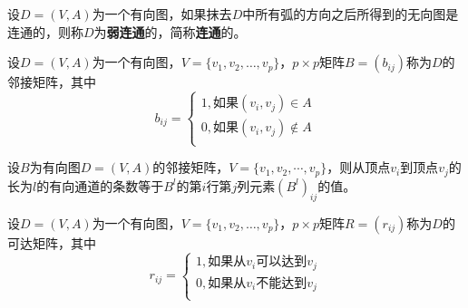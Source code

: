    \begin{Def}
   设$D=(V,A)$为一个有向图，如果抹去$D$中所有弧的方向之后所得到的无向图是连通的，则称$D$为{\bfseries 弱连通}的，简称{\bfseries 连通}的。 
  \end{Def}
  \centering

 \begin{Def}
   设$D=(V,A)$为一个有向图，$V=\{v_1,v_2,\ldots, v_p\}$，$p\times p$矩阵$B=(b_{ij})$称为$D$的邻接矩阵，其中
  \[b_{ij}=\begin{cases}
      1, \text{如果}(v_i,v_j)\in A\\
      0, \text{如果}(v_i,v_j)\notin A\\
    \end{cases}
  \]
 \end{Def}
   \begin{Thm}
   设$B$为有向图$D=(V,A)$的邻接矩阵，$V=\{v_1,v_2,\cdots,v_p\}$，则从顶点$v_i$到顶点$v_j$的长为$l$的有向通道的条数等于$B^l$的第$i$行第$j$列元素$(B^l)_{ij}$的值。 
  \end{Thm}
 \begin{Def}
   设$D=(V,A)$为一个有向图，$V=\{v_1,v_2,\ldots, v_p\}$，$p\times p$矩阵$R=(r_{ij})$称为$D$的可达矩阵，其中
  \[r_{ij}=\begin{cases}
      1, \text{如果从}v_i\text{可以达到}v_j\\
      0, \text{如果从}v_i\text{不能达到}v_j\\
    \end{cases}
  \]
 \end{Def}

